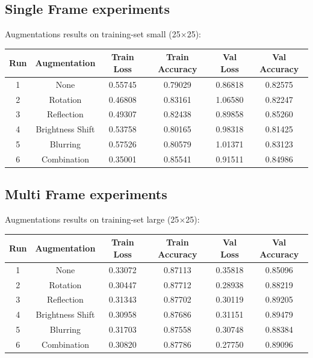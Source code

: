 \documentclass[
a4paper,     %
10pt         %
]{scrartcl}  %
\begin{document}
\subsection{Single Frame experiments}
Augmentations results on training-set small (25$\times$25):
  \begin{center}
    \begin{tabular}{||c c c c c c||}
     \hline
     Run & Augmentation & Train Loss & Train Accuracy & Val Loss & Val Accuracy \\ [0.5ex]
     \hline\hline
     1 & None               & 0.55745 & 0.79029 & 0.86818 & 0.82575 \\
     \hline
     2 & Rotation           & 0.46808 & 0.83161 & 1.06580 & 0.82247 \\
     \hline
     3 & Reflection         & 0.49307 & 0.82438 & 0.89858 & 0.85260 \\
     \hline
     4 & Brightness Shift   & 0.53758 & 0.80165 & 0.98318 & 0.81425 \\
     \hline
     5 & Blurring           & 0.57526 & 0.80579 & 1.01371 & 0.83123 \\
     \hline
     6 & Combination        & 0.35001 & 0.85541 & 0.91511 & 0.84986 \\
     \hline
    \end{tabular}
  \end{center}

\subsection{Multi Frame experiments}
Augmentations results on training-set large (25$\times$25):
  \begin{center}
    \begin{tabular}{||c c c c c c||}
     \hline
     Run & Augmentation & Train Loss & Train Accuracy & Val Loss & Val Accuracy \\ [0.5ex]
     \hline\hline
     1 & None               & 0.33072 & 0.87113 & 0.35818 & 0.85096 \\
     \hline
     2 & Rotation           & 0.30447 & 0.87712 & 0.28938 & 0.88219 \\
     \hline
     3 & Reflection         & 0.31343 & 0.87702 & 0.30119 & 0.89205 \\
     \hline
     4 & Brightness Shift   & 0.30958 & 0.87686 & 0.31151 & 0.89479 \\
     \hline
     5 & Blurring           & 0.31703 & 0.87558 & 0.30748 & 0.88384 \\
     \hline
     6 & Combination        & 0.30820 & 0.87786 & 0.27750 & 0.89096 \\
     \hline
    \end{tabular}
  \end{center}
\end{document}
